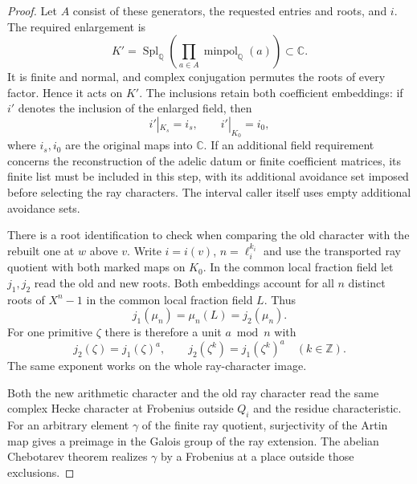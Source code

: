 \begin{proof}
Let \(A\) consist of these generators, the requested entries and
roots, and \(i\). The required enlargement is
\[
 K'=\operatorname{Spl}_{\mathbb Q}
          \left(\prod_{a\in A}\operatorname{minpol}_{\mathbb Q}(a)\right)
           \subset\mathbb C .
\]
It is finite and normal, and complex conjugation permutes the roots
of every factor. Hence it acts on \(K'\).
The inclusions retain both coefficient embeddings: if \(i'\) denotes the inclusion of the enlarged field, then
\[
 i'|_{K_s}=i_s,\qquad i'|_{K_0}=i_0,
\]
where \(i_s,i_0\) are the original maps into \(\mathbb C\). If an additional field requirement concerns the
reconstruction of the adelic datum or finite coefficient matrices,
its finite list must be included in this step, with its
additional avoidance set imposed before selecting the ray
characters. The interval caller itself uses empty additional
avoidance sets. \label{cor:automorphic-realization-55}

There is a root identification to check when comparing the
old character with the rebuilt one at \(w\) above \(v\).
Write \(i=i(v)\), \(n=\ell_i^{k_i}\) and use the transported ray
quotient with both marked maps on \(K_0\). In the common local
fraction field let \(j_1,j_2\) read the old and new roots. Both embeddings account for all \(n\) distinct roots of \(X^n-1\) in the common local fraction field \(L\). Thus
\[
 j_1(\mu_n)=\mu_n(L)=j_2(\mu_n).
\] For one
primitive \(\zeta\) there is therefore a unit \(a\bmod n\) with
\[
 j_2(\zeta)=j_1(\zeta)^a,\qquad
 j_2(\zeta^k)=j_1(\zeta^k)^a\quad(k\in\mathbb Z).
\]
The same exponent works on the whole ray-character image.

Both the new arithmetic character and the old ray character
read the same complex Hecke character at Frobenius outside
\(Q_i\) and the residue characteristic. For an arbitrary element
\(\gamma\) of the finite ray quotient, surjectivity of the Artin
map gives a preimage in the Galois group of the ray extension.
The abelian Chebotarev theorem realizes \(\gamma\) by a
Frobenius at a place outside those exclusions.


\end{proof}
